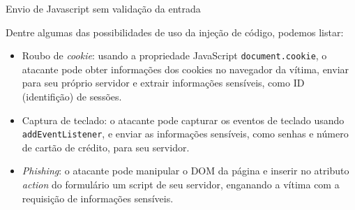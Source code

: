 \begin{frame}{}{Envio de Javascript sem validação da entrada}

Dentre algumas das possibilidades de uso da injeção de código, podemos
listar:

\begin{itemize}
\item Roubo de {\it cookie\/}: usando a propriedade JavaScript {\tt document.cookie},
  o atacante pode obter informações dos cookies no
  navegador da vítima, enviar para seu próprio servidor e extrair
  informações sensíveis, como ID (identifição) de sessões.\pause
\item Captura de teclado: o atacante pode capturar os eventos de
  teclado usando {\tt addEventListener}, e enviar as informações
  sensíveis, como senhas e número de cartão de crédito, para seu
  servidor.\pause
\item {\it Phishing\/}: o atacante pode manipular o DOM da página e
  inserir no atributo {\it action\/} do formulário um script de seu
  servidor, enganando a vítima com a requisição de informações
  sensíveis.
\end{itemize}

\end{frame}

